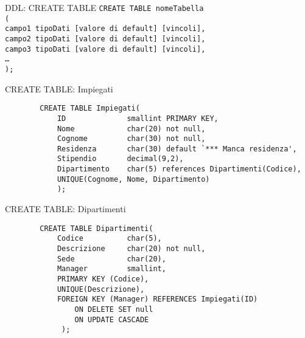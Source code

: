 \begin{frame}{DDL: CREATE TABLE}
    \texttt{CREATE TABLE nomeTabella
    \\(
    \\campo1 tipoDati [valore di default] [vincoli],
    \\campo2 tipoDati [valore di default] [vincoli],
    \\campo3 tipoDati [valore di default] [vincoli],
    \\\ldots
     \\);}
\end{frame}
%
\begin{frame}[fragile]{CREATE TABLE: Impiegati}
    \begin{verbatim}
        CREATE TABLE Impiegati(
            ID              smallint PRIMARY KEY,
            Nome            char(20) not null,
            Cognome         char(30) not null,
            Residenza       char(30) default `*** Manca residenza',
            Stipendio       decimal(9,2),
            Dipartimento    char(5) references Dipartimenti(Codice),
            UNIQUE(Cognome, Nome, Dipartimento)
            );
    \end{verbatim}
\end{frame}
%
\begin{frame}[fragile]{CREATE TABLE: Dipartimenti}
    \begin{verbatim}
        CREATE TABLE Dipartimenti(
            Codice          char(5),
            Descrizione     char(20) not null,
            Sede            char(20),
            Manager         smallint,
            PRIMARY KEY (Codice),
            UNIQUE(Descrizione),
            FOREIGN KEY (Manager) REFERENCES Impiegati(ID)
                ON DELETE SET null
                ON UPDATE CASCADE
             );    
    \end{verbatim}
    
\end{frame}